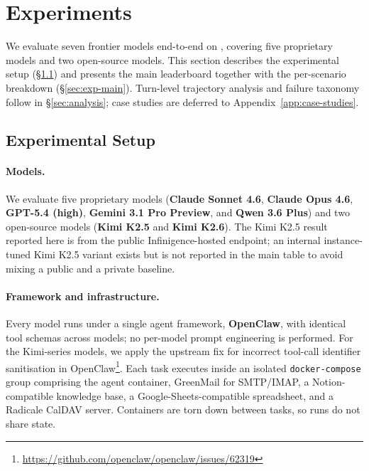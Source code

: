 
\section{Experiments}
\label{sec:exp}

We evaluate seven frontier models end-to-end on \bench{}, covering five proprietary models and two open-source models. This section describes the experimental setup (\S\ref{sec:exp-setup}) and presents the main leaderboard together with the per-scenario breakdown (\S\ref{sec:exp-main}). Turn-level trajectory analysis and failure taxonomy follow in \S\ref{sec:analysis}; case studies are deferred to Appendix~\ref{app:case-studies}.

\subsection{Experimental Setup}
\label{sec:exp-setup}
\label{sec:protocol}

\paragraph{Models.} We evaluate five proprietary models (\textbf{Claude Sonnet 4.6}, \textbf{Claude Opus 4.6}, \textbf{GPT-5.4 (high)}, \textbf{Gemini 3.1 Pro Preview}, and \textbf{Qwen 3.6 Plus}) and two open-source models (\textbf{Kimi K2.5} and \textbf{Kimi K2.6}). The Kimi K2.5 result reported here is from the public Infinigence-hosted endpoint; an internal instance-tuned Kimi K2.5 variant exists but is not reported in the main table to avoid mixing a public and a private baseline.

\paragraph{Framework and infrastructure.} Every model runs under a single agent framework, \textbf{OpenClaw}, with identical tool schemas across models; no per-model prompt engineering is performed. For the Kimi-series models, we apply the upstream fix for incorrect tool-call identifier sanitisation in OpenClaw\footnote{\url{https://github.com/openclaw/openclaw/issues/62319}}. Each task executes inside an isolated \texttt{docker-compose} group comprising the agent container, GreenMail for SMTP/IMAP, a Notion-compatible knowledge base, a Google-Sheets-compatible spreadsheet, and a Radicale CalDAV server. Containers are torn down between tasks, so runs do not share state.

